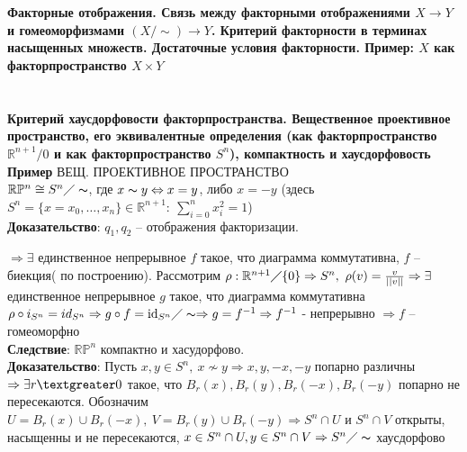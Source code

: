 \newpage
\section{}
	\textbf{Факторные отображения. Связь между факторными отображениями $X \to Y$ и гомеоморфизмами $(X\slash \sim) \to Y$. Критерий факторности в терминах насыщенных множеств. Достаточные условия факторности. Пример: $X$ как факторпространство $X \times Y$}\\


\newpage
\section{}
	\textbf{Критерий хаусдорфовости факторпространства. Вещественное проективное пространство, его эквивалентные определения (как факторпространство $\mathbb{R}^{n+1}\slash{0}$ и как факторпространство $S^n$), компактность и хаусдорфовость}\\
	\textbf{Пример} ВЕЩ. ПРОЕКТИВНОЕ ПРОСТРАНСТВО\\
	$\mathbb{R} \mathbb{P}^n \cong S^n\diagup\thicksim$, где $x\thicksim y \Leftrightarrow x = y$, либо $x = -y$ (здесь $S^n=\{x = x_0,\ldots ,x_n\}\in \mathbb{R}^{n + 1}:\ \sum\limits^{n}_{i = 0} x_i^2=1$)\\
	\textbf{Доказательство}: $q_1, q_2$ -- отображения факторизации.
	\begin{figure}[h]
	\end{figure}
	$\Rightarrow \exists$ единственное непрерывное $f$ такое, что диаграмма коммутативна, $f$ -- биекция( по построению). Рассмотрим $\rho: \mathbb{R}^{n + 1}\diagup\{0\} \Rightarrow S^n,\ \rho(v) = \frac{v}{||v||} \Rightarrow \exists$ единственное непрерывное $g$ такое, что диаграмма коммутативна $\rho \circ i_{S^n} = id_{S^n} \Rightarrow g \circ f=\text{id}_{S^n}\diagup\thicksim \Rightarrow g=f^{-1} \Rightarrow f^{-1}$ - непрерывно $\Rightarrow f$ -- гомеоморфно\\
	\textbf{Следствие}: $\mathbb{R} \mathbb{P}^n$ компактно и хасудорфово.\\
	\textbf{Доказательство}: Пусть $x,y \in S^n,\ x\nsim y\Rightarrow x,y, -x, -y$ попарно различны $\Rightarrow \exists r\textgreater 0$ такое, что $B_r(x), B_r(y), B_r(-x), B_r(-y)$ попарно не пересекаются. Обозначим $U=B_r(x)\cup B_r( - x),\ V = B_r(y)\cup B_r(-y) \Rightarrow S^n\cap U$ и $S^n\cap V$ открыты, насыщенны и не пересекаются, $x\in S^n\cap U, y\in S^n\cap V \Rightarrow S^n\diagup \thicksim$ хаусдорфово\\
	\begin{figure}[h]
	\end{figure}

